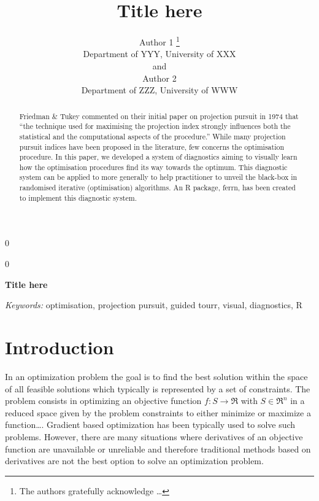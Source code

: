 \documentclass[12pt]{article}
\newcommand{\blind}{0}
\begin{document}
\def\spacingset#1{\renewcommand{\baselinestretch}%
{#1}\small\normalsize} \spacingset{1}



\blind
{
  \title{\bf Title here}

  \author{
        Author 1 \thanks{The authors gratefully acknowledge \ldots{}} \\
    Department of YYY, University of XXX\\
     and \\     Author 2 \\
    Department of ZZZ, University of WWW\\
      }
  \maketitle
} \fi

\blind
{
  \bigskip
  \bigskip
  \bigskip
  \begin{center}
    {\LARGE\bf Title here}
  \end{center}
  \medskip
} \fi

\bigskip
\begin{abstract}
Friedman \& Tukey commented on their initial paper on projection pursuit
in 1974 that ``the technique used for maximising the projection index
strongly influences both the statistical and the computational aspects
of the procedure.'' While many projection pursuit indices have been
proposed in the literature, few concerns the optimisation procedure. In
this paper, we developed a system of diagnostics aiming to visually
learn how the optimisation procedures find its way towards the optimum.
This diagnostic system can be applied to more generally to help
practitioner to unveil the black-box in randomised iterative
(optimisation) algorithms. An R package, ferrn, has been created to
implement this diagnostic system.
\end{abstract}

\noindent%
{\it Keywords:} optimisation, projection pursuit, guided tourr, visual, diagnostics, R
\vfill

\newpage
\spacingset{1.45} %

\hypertarget{introduction}{%
\section{Introduction}\label{introduction}}

In an optimization problem the goal is to find the best solution within
the space of all feasible solutions which typically is represented by a
set of constraints. The problem consists in optimizing an objective
function \(f: S \rightarrow \Re\) with \(S \in \Re^n\) in a reduced
space given by the problem constraints to either minimize or maximize a
function\ldots{}. Gradient based optimization has been typically used to
solve such problems. However, there are many situations where
derivatives of an objective function are unavailable or unreliable and
therefore traditional methods based on derivatives are not the best
option to solve an optimization problem.
\end{document}
